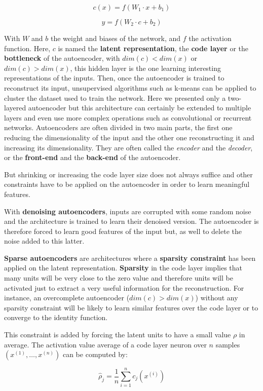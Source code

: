\documentclass[master,final,11pt]{iscs-thesis}
\begin{document}
\[
c(x) = f(W_1 \cdot x + b_1)
\]

\[
y = f(W_2 \cdot c + b_2)
\]

With $W$ and $b$ the weight and biases of the network, and $f$ the activation function. Here, $c$ is named the \textbf{latent representation},  the \textbf{code layer} or the \textbf{bottleneck} of the autoencoder, with $dim(c) < dim(x)$ or $dim(c) > dim(x)$, this hidden layer is the one learning interesting representations of the inputs. Then, once the autoencoder is trained to reconstruct its input, unsupervised algorithms such as k-means can be applied to cluster the dataset used to train the network.
Here we presented only a two-layered autoencoder but this architecture can certainly be extended to multiple layers and even use more complex operations such as convolutional or recurrent networks. Autoencoders are often divided in two main parts, the first one reducing the dimensionality of the input and the other one reconstructing it and increasing its dimensionality. They are often called the \textit{encoder} and the \textit{decoder}, or the \textbf{front-end} and the \textbf{back-end} of the autoencoder.

But shrinking or increasing the code layer size does not always suffice and other constraints have to be applied on the autoencoder in order to learn meaningful features.

With \textbf{denoising autoencoders}, inputs are corrupted with some random noise and the architecture is trained to learn their denoised version. The autoencoder is therefore forced to learn good features of the input but, as well to delete the noise added to this latter.

\textbf{Sparse autoencoders} are architectures where a \textbf{sparsity constraint} has been applied on the latent representation. \textbf{Sparsity} in the code layer implies that many units will be very close to the zero value and therefore units will be activated just to extract a very useful information for the reconstruction. For instance, an overcomplete autoencoder ($dim(c) > dim(x)$) without any sparsity constraint will be likely to learn similar features over the code layer or to converge to the identity function.

This constraint is added by forcing the latent units to have a small value $\rho$ in average. The activation value average of a code layer neuron over $n$ samples $(x^{(1)}, \dots, x^{(n)})$ can be computed by:

\[
\hat{\rho}_j = \frac{1}{n}\sum_{i=1}^n{c_j(x^{(i)})}
\]
\end{document}

